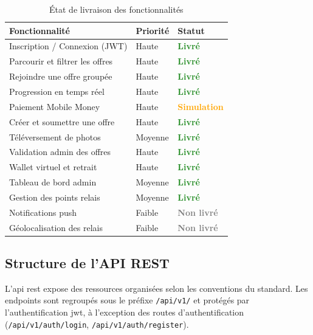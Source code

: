 \documentclass[12pt, a4paper, oneside]{report}
\begin{document}
\begin{table}[H]
  \centering
  \caption{État de livraison des fonctionnalités}
  \label{tab:livraison}
  \begin{tabularx}{\textwidth}{|X|l|l|}
    \hline
    \textbf{Fonctionnalité} & \textbf{Priorité} & \textbf{Statut} \\
    \hline
    Inscription / Connexion (JWT) & Haute & \textcolor{ForestGreen}{\textbf{Livré}} \\
    \hline
    Parcourir et filtrer les offres & Haute & \textcolor{ForestGreen}{\textbf{Livré}} \\
    \hline
    Rejoindre une offre groupée & Haute & \textcolor{ForestGreen}{\textbf{Livré}} \\
    \hline
    Progression en temps réel & Haute & \textcolor{ForestGreen}{\textbf{Livré}} \\
    \hline
    Paiement Mobile Money & Haute & \textcolor{orange}{\textbf{Simulation}} \\
    \hline
    Créer et soumettre une offre & Haute & \textcolor{ForestGreen}{\textbf{Livré}} \\
    \hline
    Téléversement de photos & Moyenne & \textcolor{ForestGreen}{\textbf{Livré}} \\
    \hline
    Validation admin des offres & Haute & \textcolor{ForestGreen}{\textbf{Livré}} \\
    \hline
    Wallet virtuel et retrait & Haute & \textcolor{ForestGreen}{\textbf{Livré}} \\
    \hline
    Tableau de bord admin & Moyenne & \textcolor{ForestGreen}{\textbf{Livré}} \\
    \hline
    Gestion des points relais & Moyenne & \textcolor{ForestGreen}{\textbf{Livré}} \\
    \hline
    Notifications push & Faible & \textcolor{gray}{\textbf{Non livré}} \\
    \hline
    Géolocalisation des relais & Faible & \textcolor{gray}{\textbf{Non livré}} \\
    \hline
  \end{tabularx}
\end{table}

\subsection{Structure de l'API REST}

L'\gls{api} \gls{rest} expose des ressources organisées selon les conventions du standard.
Les endpoints sont regroupés sous le préfixe \texttt{/api/v1/} et protégés par
l'authentification \gls{jwt}, à l'exception des routes d'authentification
(\texttt{/api/v1/auth/login}, \texttt{/api/v1/auth/register}).
\end{document}
